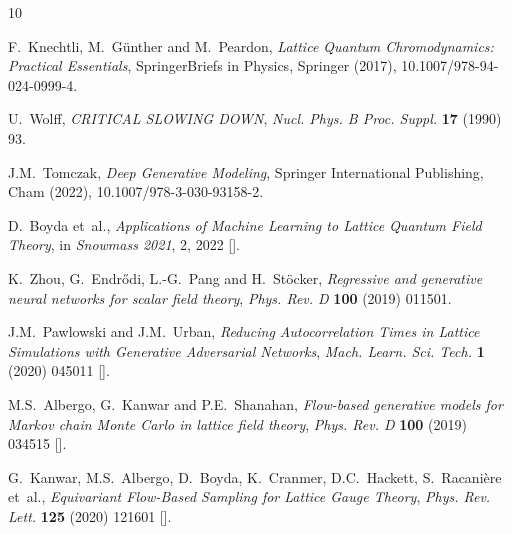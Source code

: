 \providecommand{\href}[2]{#2}\begingroup\raggedright\begin{thebibliography}{10}

F.~Knechtli, M.~G\"unther and M.~Peardon, \emph{{Lattice Quantum
  Chromodynamics: Practical Essentials}}, SpringerBriefs in Physics, Springer
  (2017),
  \href{https://doi.org/10.1007/978-94-024-0999-4}{10.1007/978-94-024-0999-4}.

U.~Wolff, \emph{{CRITICAL SLOWING DOWN}},
  \href{https://doi.org/10.1016/0920-5632(90)90224-I}{\emph{Nucl. Phys. B Proc.
  Suppl.} {\bfseries 17} (1990) 93}.

J.M.~Tomczak, \emph{Deep Generative Modeling}, {Springer International
  Publishing}, {Cham} (2022),
  \href{https://doi.org/10.1007/978-3-030-93158-2}{10.1007/978-3-030-93158-2}.

D.~Boyda et~al., \emph{{Applications of Machine Learning to Lattice Quantum
  Field Theory}},  in \emph{{Snowmass 2021}}, 2, 2022
  [\href{https://arxiv.org/abs/2202.05838}{{}}].

K.~Zhou, G.~Endr{\H o}di, L.-G.~Pang and H.~St{\"o}cker, \emph{Regressive and
  generative neural networks for scalar field theory},
  \href{https://doi.org/10.1103/PhysRevD.100.011501}{\emph{Phys. Rev. D}
  {\bfseries 100} (2019) 011501}.

J.M.~Pawlowski and J.M.~Urban, \emph{{Reducing Autocorrelation Times in Lattice
  Simulations with Generative Adversarial Networks}},
  \href{https://doi.org/10.1088/2632-2153/abae73}{\emph{Mach. Learn. Sci.
  Tech.} {\bfseries 1} (2020) 045011}
  [\href{https://arxiv.org/abs/1811.03533}{{}}].

M.S.~Albergo, G.~Kanwar and P.E.~Shanahan, \emph{Flow-based generative models
  for {{Markov}} chain {{Monte Carlo}} in lattice field theory},
  \href{https://doi.org/10.1103/PhysRevD.100.034515}{\emph{Phys. Rev. D}
  {\bfseries 100} (2019) 034515}
  [\href{https://arxiv.org/abs/1904.12072}{{}}].

G.~Kanwar, M.S.~Albergo, D.~Boyda, K.~Cranmer, D.C.~Hackett, S.~Racani{\`e}re
  et~al., \emph{Equivariant {{Flow-Based Sampling}} for {{Lattice Gauge
  Theory}}}, \href{https://doi.org/10.1103/PhysRevLett.125.121601}{\emph{Phys.
  Rev. Lett.} {\bfseries 125} (2020) 121601}
  [\href{https://arxiv.org/abs/2003.06413}{{}}].


\end{thebibliography}
